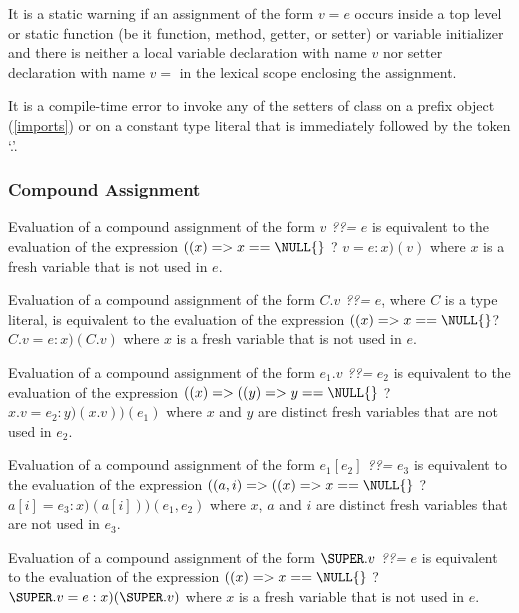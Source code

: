 \documentclass{article}
\begin{document}

\LMHash{}
It is a static warning if an assignment of the form $v = e$ occurs inside a top level or static function (be it function, method, getter, or setter) or variable initializer and there is neither a local variable declaration with name $v$  nor setter declaration with name $v=$ in the lexical scope enclosing the assignment.

\LMHash{}
It is a compile-time error to invoke any of the setters of class  on a prefix object (\ref{imports}) or on a constant type literal that is  immediately followed by the token `.'.



\subsubsection{Compound Assignment}

\LMHash{}
Evaluation of a compound assignment of the form $v$ {\em ??=} $e$ is equivalent to the evaluation of the expression  $((x) => x == \NULL{}$ ?  $v=e : x)(v)$ where $x$ is a fresh variable that is not used in $e$.

\LMHash{}
Evaluation of a compound assignment of the form $C.v$ {\em ??=} $e$, where $C$ is a type literal, is equivalent to the evaluation of the expression  $((x) => x == \NULL{}$?  $C.v=e: x)(C.v)$ where $x$ is a fresh variable that is not used in $e$.


\LMHash{}
Evaluation of a compound assignment of the form $e_1.v$ {\em ??=} $e_2$ is equivalent to the evaluation of the expression  $((x) =>((y) => y == \NULL{}$ ? $ x.v = e_2: y)(x.v))(e_1)$ where $x$ and $y$ are distinct fresh variables that are not used in $e_2$.

\LMHash{}
Evaluation of a compound assignment of the form  $e_1[e_2]$  {\em ??=} $e_3$ is equivalent to the evaluation of the expression
$((a, i) => ((x) => x == \NULL{}$ ?  $a[i] = e_3: x)(a[i]))(e_1, e_2)$ where $x$, $a$ and $i$ are distinct fresh variables that are not used in $e_3$.

\LMHash{}
Evaluation of a compound assignment of the form $\SUPER.v$  {\em ??=} $e$ is equivalent to the evaluation of the expression  $((x) => x == \NULL{}$ ? $\SUPER.v = e: x)(\SUPER.v)$ where $x$ is a fresh variable that is not used in $e$.
\end{document}
